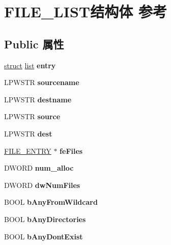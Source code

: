 \hypertarget{struct_f_i_l_e___l_i_s_t}{}\section{F\+I\+L\+E\+\_\+\+L\+I\+S\+T结构体 参考}
\label{struct_f_i_l_e___l_i_s_t}
\subsection*{Public 属性}
\begin{DoxyCompactItemize}
\item 
\mbox{\label{struct_f_i_l_e___l_i_s_t_aaf74fca001431ea66f78dee62b0c6e55}} 
\hyperlink{interfacestruct}{struct} \hyperlink{classlist}{list} {\bfseries entry}
\item 
\mbox{\label{struct_f_i_l_e___l_i_s_t_a4b43de357f27390ac6acaedb1ee3699b}} 
L\+P\+W\+S\+TR {\bfseries sourcename}
\item 
\mbox{\label{struct_f_i_l_e___l_i_s_t_ac3d2bcb2e1a5c8fbbf1b5c3c57666bbe}} 
L\+P\+W\+S\+TR {\bfseries destname}
\item 
\mbox{\label{struct_f_i_l_e___l_i_s_t_a57a29245b9a3acdb2e7ee38a767b407f}} 
L\+P\+W\+S\+TR {\bfseries source}
\item 
\mbox{\label{struct_f_i_l_e___l_i_s_t_ae7e01b0f0a87cbb402833c830aea840c}} 
L\+P\+W\+S\+TR {\bfseries dest}
\item 
\mbox{\label{struct_f_i_l_e___l_i_s_t_a64f6f256ed1d41912926faddf2f970ce}} 
\hyperlink{struct_f_i_l_e___e_n_t_r_y}{F\+I\+L\+E\+\_\+\+E\+N\+T\+RY} $\ast$ {\bfseries fe\+Files}
\item 
\mbox{\label{struct_f_i_l_e___l_i_s_t_a85e165f4bc74f2498ca34901ac20e754}} 
D\+W\+O\+RD {\bfseries num\+\_\+alloc}
\item 
\mbox{\label{struct_f_i_l_e___l_i_s_t_a42dd61e93c6d1afef02c415ee5cc6378}} 
D\+W\+O\+RD {\bfseries dw\+Num\+Files}
\item 
\mbox{\label{struct_f_i_l_e___l_i_s_t_a7377e0fc2f615b5c571d38db9e2151a3}} 
B\+O\+OL {\bfseries b\+Any\+From\+Wildcard}
\item 
\mbox{\label{struct_f_i_l_e___l_i_s_t_ab8d22fab16ec65e6d4628375b55ad36e}} 
B\+O\+OL {\bfseries b\+Any\+Directories}
\item 
\mbox{\label{struct_f_i_l_e___l_i_s_t_afb96be951e182a6d7e7912996b71fce0}} 
B\+O\+OL {\bfseries b\+Any\+Dont\+Exist}
\end{DoxyCompactItemize}



